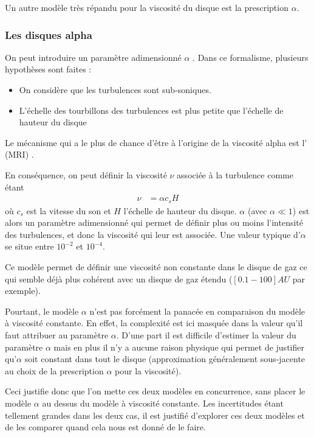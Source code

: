Un autre modèle très répandu pour la viscosité du disque est la prescription $\alpha$.

\subsubsection{Les disques alpha}
On peut introduire un paramètre adimensionné $\alpha$ \citep{shakura1973black}. Dans ce formalisme, plusieurs hypothèses sont faites : 
\begin{itemize}
\item On considère que les turbulences sont sub-soniques.
\item L'échelle des tourbillons des turbulences est plus petite que l'échelle de hauteur du disque
\end{itemize}
Le mécanisme qui a le plus de chance d'être à l'origine de la viscosité alpha est l' (MRI) \citep{balbus1991powerful}. 

\bigskip

En conséquence, on peut définir la viscosité $\nu$ associée à la turbulence comme étant 
\begin{align}
\nu &= \alpha c_s H
\end{align}
où $c_s$ est la vitesse du son et $H$ l'échelle de hauteur du disque. $\alpha$ (avec $\alpha \ll 1$) est alors un paramètre adimensionné qui permet de définir plus ou moins l'intensité des turbulences, et donc la viscosité qui leur est associée. Une valeur typique d'$\alpha$ se situe entre $10^{-2}$ et $10^{-4}$.

Ce modèle permet de définir une viscosité non constante dans le disque de gaz ce qui semble déjà plus cohérent avec un disque de gaz étendu ($[0.1-100]\unit{AU}$ par exemple). 

Pourtant, le modèle $\alpha$ n'est pas forcément la panacée en comparaison du modèle à viscosité constante. En effet, la complexité est ici masquée dans la valeur qu'il faut attribuer au paramètre $\alpha$. D'une part il est difficile d'estimer la valeur du paramètre $\alpha$ mais en plus il n'y a aucune raison physique qui permet de justifier qu'$\alpha$ soit constant dans tout le disque (approximation généralement sous-jacente au choix de la prescription $\alpha$ pour la viscosité).

Ceci justifie donc que l'on mette ces deux modèles en concurrence, sans placer le modèle $\alpha$ au dessus du modèle à viscosité constante. Les incertitudes étant tellement grandes dans les deux cas, il est justifié d'explorer ces deux modèles et de les comparer quand cela nous est donné de le faire.

